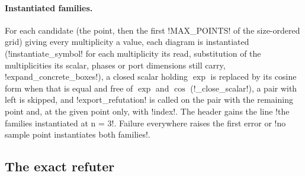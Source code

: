 {{{\paragraph{Instantiated families.} For each candidate (the point, then the first
\lexpy!MAX_POINTS! of the size-ordered grid) giving every multiplicity a value, each diagram is
instantiated (\lexpy!instantiate_symbol! for each multiplicity its \bboxes read, substitution of the
multiplicities its scalar, phases or port dimensions still carry, \lexpy!expand_concrete_boxes!), a
closed scalar holding $\exp$ is replaced by its cosine form when that is equal and free of
$\exp$ and $\cos$ (\lexpy!_close_scalar!), a pair with \bboxes left is skipped, and
\lexpy!export_refutation! is called on the pair with the remaining point and, at the given point
only, with \lexcode!index!. The header gains the line \lexcode!the families instantiated at n = 3!.
Failure everywhere raises the first error or \lexcode!no sample point instantiates both families!.

\subsection{The exact refuter}\label{sec:lean-export-refute-exact}

}}}
